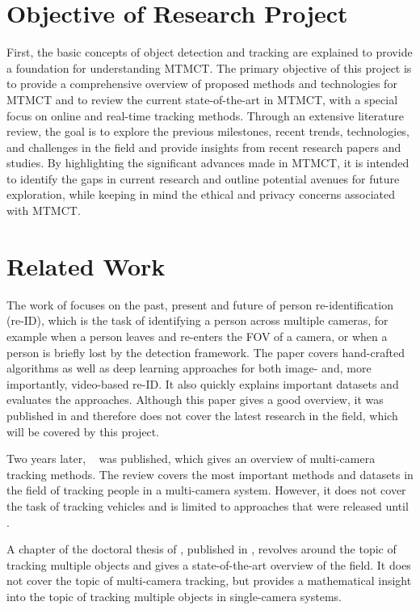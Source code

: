 \section{Objective of Research Project}\label{sec:objective_of_review}
First, the basic concepts of object detection and tracking are explained to provide a foundation for understanding MTMCT. The primary objective of this project is to provide a comprehensive overview of proposed methods and technologies for MTMCT and to review the current state-of-the-art in MTMCT, with a special focus on online and real-time tracking methods. Through an extensive literature review, the goal is to explore the previous milestones, recent trends, technologies, and challenges in the field and provide insights from recent research papers and studies. By highlighting the significant advances made in MTMCT, it is intended to identify the gaps in current research and outline potential avenues for future exploration, while keeping in mind the ethical and privacy concerns associated with MTMCT.

\section{Related Work}\label{sec:related_work}
The work of \textcite{Zheng16c} focuses on the past, present and future of person re-identification (re-ID), which is the task of identifying a person across multiple cameras, for example when a person leaves and re-enters the FOV of a camera, or when a person is briefly lost by the detection framework. The paper covers hand-crafted algorithms as well as deep learning approaches for both image- and, more importantly, video-based re-ID. It also quickly explains important datasets and evaluates the approaches. Although this paper gives a good overview, it was published in \citeyear{Zheng16c} and therefore does not cover the latest research in the field, which will be covered by this project.

Two years later, ~\cite{Iguernaissi18} was published, which gives an overview of multi-camera tracking methods. The review covers the most important methods and datasets in the field of tracking people in a multi-camera system. However, it does not cover the task of tracking vehicles and is limited to approaches that were released until \citeyear{Iguernaissi18}.

A chapter of the doctoral thesis of \textcite[Chapter 5]{Tian19}, published in \citeyear{Tian19}, revolves around the topic of tracking multiple objects and gives a state-of-the-art overview of the field. It does not cover the topic of multi-camera tracking, but provides a mathematical insight into the topic of tracking multiple objects in single-camera systems.

